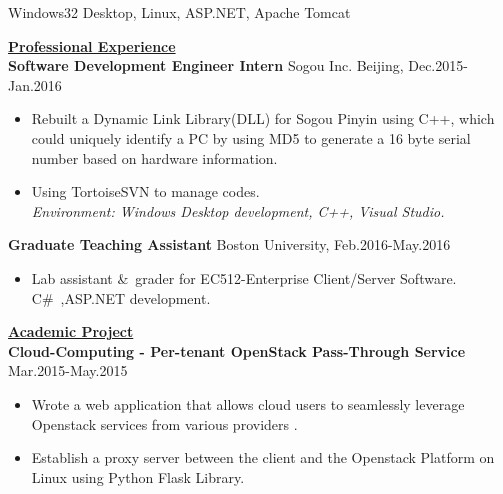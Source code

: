 \documentclass{resume} %
\begin{document}
\begin{spacing}{1}
\begin{center}
\hspace{-6cm}{\bf Environment:} \hspace{1.55cm} {Windows32 Desktop, Linux, ASP.NET, Apache Tomcat } \\

\vspace{4mm}

\uline{{\bf{\LARGE Professional Experience}}\hfill{\hspace{10cm}{}}} \\
\vspace{1mm}
{\bf Software Development Engineer Intern} \hfill {\small Sogou Inc. Beijing, Dec.2015-Jan.2016} \\
\vspace{-0mm}
\begin{itemize}
\item{Rebuilt a Dynamic Link Library(DLL) for Sogou Pinyin using C++, which could uniquely identify a PC by using MD5 to generate a 16 byte serial number based on hardware information. }\\
\item{Using TortoiseSVN to manage codes.}\\
    \hspace{-9mm}\textit{Environment: Windows Desktop development, C++, Visual Studio.}
\end{itemize}
{\bf Graduate Teaching Assistant } \hfill {\small Boston University,  Feb.2016-May.2016} \\
\vspace{-0mm}
\begin{itemize}
\item{ Lab assistant \&\ grader for EC512-Enterprise Client/Server Software. C\#\ ,ASP.NET development.}\\

\end{itemize}
\vspace{-1mm}
\vspace{2.5mm}
\uline{{\bf{\LARGE Academic Project}}\hfill{\hspace{10cm}{}}} \\
\vspace{1mm}	
{\bf Cloud-Computing - Per-tenant OpenStack Pass-Through Service } \hfill {\small Mar.2015-May.2015} \\
\vspace{-0mm}
\begin{itemize}
\item{Wrote a web application that allows cloud users to seamlessly leverage Openstack services from various providers
.} \\
\item{Establish a proxy server between the client and the Openstack Platform on Linux using Python Flask Library.} \\


\end{itemize}
\end{center}
\end{spacing}
\end{document}
